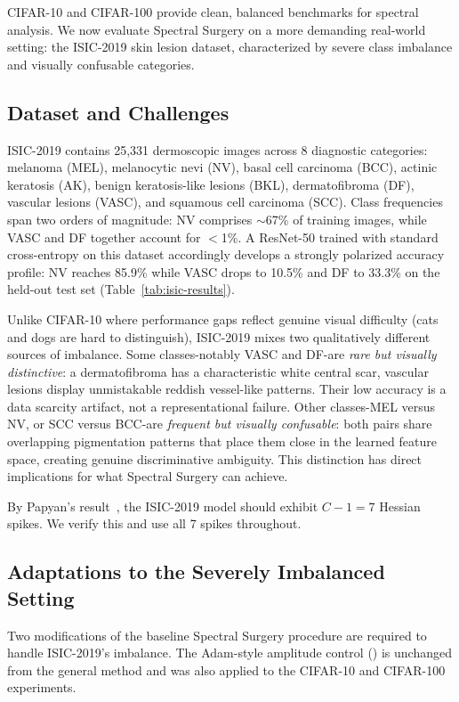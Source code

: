 \documentclass[11pt,a4paper]{article}
\begin{document}
CIFAR-10 and CIFAR-100 provide clean, balanced benchmarks for spectral
analysis. We now evaluate Spectral Surgery on a more demanding real-world
setting: the ISIC-2019 skin lesion dataset, characterized by severe class
imbalance and visually confusable categories.

\subsection{Dataset and Challenges}

ISIC-2019 contains 25,331 dermoscopic images across 8 diagnostic
categories: melanoma (MEL), melanocytic nevi (NV), basal cell carcinoma
(BCC), actinic keratosis (AK), benign keratosis-like lesions (BKL),
dermatofibroma (DF), vascular lesions (VASC), and squamous cell carcinoma
(SCC). Class frequencies span two orders of magnitude: NV comprises
$\sim$67\% of training images, while VASC and DF together account for
$<$1\%. A ResNet-50 trained with standard cross-entropy on this dataset
accordingly develops a strongly polarized accuracy profile: NV reaches
85.9\% while VASC drops to 10.5\% and DF to 33.3\% on the held-out test
set (Table~\ref{tab:isic-results}).

Unlike CIFAR-10 where performance gaps reflect genuine visual difficulty
(cats and dogs are hard to distinguish), ISIC-2019 mixes two qualitatively
different sources of imbalance. Some classes-notably VASC and DF-are
\emph{rare but visually distinctive}: a dermatofibroma has a characteristic
white central scar, vascular lesions display unmistakable reddish
vessel-like patterns. Their low accuracy is a data scarcity artifact, not
a representational failure. Other classes-MEL versus NV, or SCC versus
BCC-are \emph{frequent but visually confusable}: both pairs share
overlapping pigmentation patterns that place them close in the learned
feature space, creating genuine discriminative ambiguity. This distinction
has direct implications for what Spectral Surgery can achieve.

By Papyan's result~\cite{papyan2020}, the ISIC-2019 model should exhibit
$C-1 = 7$ Hessian spikes. We verify this and use all 7 spikes throughout.

\subsection{Adaptations to the Severely Imbalanced Setting}
\label{sec:isic-adaptations}

Two modifications of the baseline Spectral Surgery procedure are required
to handle ISIC-2019's imbalance. The Adam-style amplitude control
() is unchanged from the general method and was also
applied to the CIFAR-10 and CIFAR-100 experiments.
\end{document}
